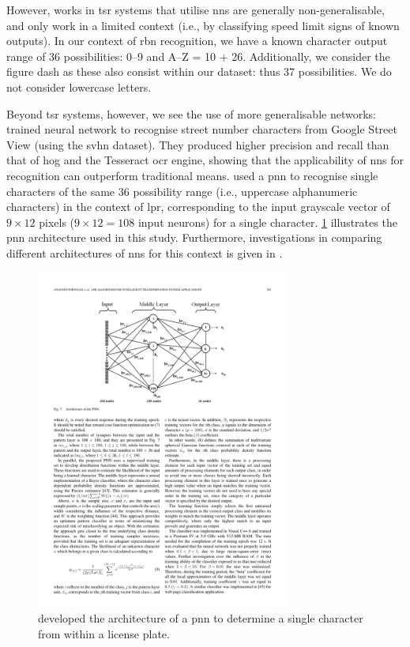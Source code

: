 However, works in \gls{tsr} systems that utilise \glspl{nn} are generally non-generalisable, and only work in a limited context (i.e., by classifying speed limit signs of known outputs). In our context of \gls{rbn} recognition, we have a known character output range of 36 possibilities: 0--9 and A--Z = 10 + 26. Additionally, we consider the figure dash as these also consist within our dataset: thus 37 possibilities. We do not consider lowercase letters.

Beyond \gls{tsr} systems, however, we see the use of more generalisable networks: \citet{Netzer:2011to} trained neural network to recognise street number characters from Google Street View (using the \gls{svhn} dataset). They produced higher precision and recall than that of \gls{hog} and the Tesseract \gls{ocr} engine, showing that the applicability of \glspl{nn} for recognition can outperform traditional means. \citet{Anagnostopoulos:2006wv} used a \gls{pnn} to recognise single characters of the same 36 possibility range (i.e., uppercase alphanumeric characters) in the context of \gls{lpr}, corresponding to the input grayscale vector of $9 \times 12$ pixels ($9 \times 12 = 108$ input neurons) for a single character. \cref{fig:background:recognition:anagnostopoulos2006_nn} illustrates the \gls{pnn} architecture used in this study. Furthermore, investigations in comparing different architectures of \glspl{nn} for this context is given in \citet{Lee:2016uy}.

\begin{figure}[h]
  \centering
  \includegraphics[width=0.75\textwidth]{images/background/anagnostopoulos2006_nn}
  \caption[A PNN used to recognise license plate characters]{\citet{Anagnostopoulos:2006wv} developed the architecture of a \gls{pnn} to determine a single character from within a license plate.}
  \label{fig:background:recognition:anagnostopoulos2006_nn}
\end{figure}


